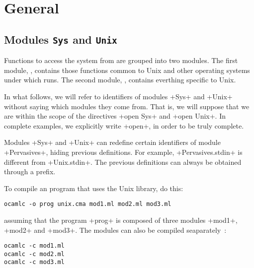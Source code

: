 %
%

\chapter{General}

\section{Modules {\normalfont\texttt{Sys}} and {\normalfont\texttt{Unix}}}

Functions to access the system from {\ocaml} are grouped into two
modules. The first module,  , contains those functions
common to Unix and other operating systems under which {\ocaml} runs.
The second module, , contains everthing specific to
Unix. 


In what follows, we will refer to identifiers of modules \ml+Sys+ and
\ml+Unix+ without saying which modules they come from.  That is, we
will suppose that we are within the scope of the directives 
\ml+open Sys+ and \ml+open Unix+. In complete examples, we explicitly write
\ml+open+, in order to be truly complete.

Modules \ml+Sys+ and \ml+Unix+ can redefine certain
identifiers of module \ml+Pervasives+, hiding previous
definitions. For example,  \ml+Pervasives.stdin+  is different from 
\ml+Unix.stdin+. The previous definitions can always be obtained
through a prefix. 


To compile an {\ocaml} program that uses the 
Unix library, do this:
%
\begin{lstlisting}
ocamlc -o prog unix.cma mod1.ml mod2.ml mod3.ml 
\end{lstlisting}
%

assuming that the program  \ml+prog+ is composed of three modules  \ml+mod1+,
\ml+mod2+ and \ml+mod3+. The modules can also be compiled seaparately~:

%
\begin{lstlisting}
ocamlc -c mod1.ml
ocamlc -c mod2.ml
ocamlc -c mod3.ml
\end{lstlisting}
%

